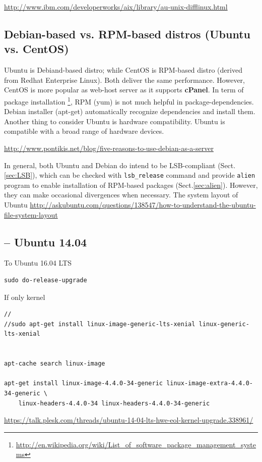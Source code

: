 \url{http://www.ibm.com/developerworks/aix/library/au-unix-difflinux.html}

\subsection{Debian-based vs. RPM-based distros (Ubuntu vs. CentOS)}
\label{sec:CentOS}
\label{sec:Ubuntu}
\label{sec:Debian}


Ubuntu is Debiand-based distro; while CentOS is RPM-based distro (derived
from Redhat Enterprise Linux).
Both deliver the same performance. However, CentOS is more popular as web-host
server as it supports {\bf cPanel}. In term of package installation
\footnote{\url{http://en.wikipedia.org/wiki/List_of_software_package_management_systems}},
RPM (yum) is not much helpful in package-dependencies. Debian installer
(apt-get) automatically recognize dependencies and install them. Another thing
to consider  Ubuntu is hardware compatibility. Ubuntu is compatible with a 
broad range of hardware devices.


\url{http://www.pontikis.net/blog/five-reasons-to-use-debian-as-a-server}

In general, both Ubuntu and Debian do intend to be LSB-compliant
(Sect.\ref{sec:LSB}), which can be checked with \verb!lsb_release! command and
provide \verb!alien! program to enable installation of RPM-based packages
(Sect.\ref{sec:alien}).
However, they can make occasional divergences when necessary. The system layout
of Ubuntu
\url{http://askubuntu.com/questions/138547/how-to-understand-the-ubuntu-file-system-layout}

\subsection{-- Ubuntu 14.04}
\label{sec:Ubuntu-14.04-upgrade}

To Ubuntu 16.04 LTS
\begin{verbatim}
sudo do-release-upgrade
\end{verbatim}

If only kernel
\begin{verbatim}
//
//sudo apt-get install linux-image-generic-lts-xenial linux-generic-lts-xenial


apt-cache search linux-image

apt-get install linux-image-4.4.0-34-generic linux-image-extra-4.4.0-34-generic \ 
    linux-headers-4.4.0-34 linux-headers-4.4.0-34-generic
\end{verbatim}
\url{https://talk.plesk.com/threads/ubuntu-14-04-lts-hwe-eol-kernel-upgrade.338961/}

